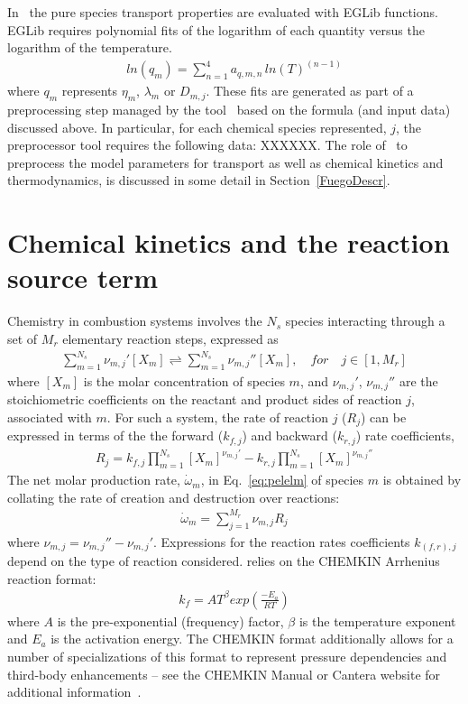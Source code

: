 In \pelelm\ the pure species transport properties are evaluated with EGLib functions.  EGLib requires polynomial fits of the logarithm of each quantity versus the logarithm of the temperature.
\begin{eqnarray*}
ln(q_m) = \sum_{n=1}^4 a_{q,m,n} \, ln(T)^{(n-1)} 
\end{eqnarray*}
where $q_m$ represents $\eta_m$, $\lambda_m$ or $D_{m,j}$. These fits are generated as part of a preprocessing step managed by the tool \fuego\ based on the formula (and input data) discussed above.  In particular, for each chemical species represented, $j$, the preprocessor tool requires the following data: XXXXXX.  The role of \fuego\ to preprocess the model parameters for transport as well as chemical kinetics and thermodynamics, is discussed in some detail in Section~\ref{FuegoDescr}.

\section{Chemical kinetics and the reaction source term}
\label{ChemKinetics}
Chemistry in combustion systems involves the $N_s$ species interacting through a set of $M_r$ elementary reaction steps, expressed as
\begin{eqnarray*}
\sum_{m=1}^{N_s} \nu_{m,j}'[X_m] \rightleftharpoons \sum_{m=1}^{N_s} \nu_{m,j}''[X_m],\quad for \quad j \in [1,M_r] 
\label{IntroKM1}
\end{eqnarray*}
where $[X_m]$ is the molar concentration of species $m$, and $\nu_{m,j}'$, $\nu_{m,j}''$ are the stoichiometric coefficients on the reactant and product sides of reaction $j$, associated with $m$. For such a system, the rate of reaction $j$ ($R_j$) can be expressed in terms of the the forward ($k_{f,j}$) and backward ($k_{r,j}$) rate coefficients,
\begin{eqnarray*} 
R_{j} = k_{f,j}\prod_{m=1}^{N_s}  [X_{m}]^{\nu_{m,j}'}-k_{r,j}\prod_{m=1}^{N_s} [X_{m}]^{\nu_{m,j}''}
\end{eqnarray*}
The net molar production rate, $ \dot{\omega}_m$, in Eq.~\ref{eq:pelelm} of species $m$ is obtained by
collating the rate of creation and destruction over reactions:
\begin{eqnarray*}
\dot{\omega}_m = \sum_{j=1}^{M_r} \nu_{m,j} R_j 
\label{IntroKM3}
\end{eqnarray*}
where $\nu_{m,j} =\nu_{m,j}'' - \nu_{m,j}'$. Expressions for the reaction rates coefficients $k_{(f,r),j}$ depend on the type of reaction considered. \pelelm \; relies on the CHEMKIN Arrhenius reaction format:
\begin{eqnarray*}
k_f = AT^{\beta} exp \left( \frac{-E_a}{RT}\right)
\end{eqnarray*}
where $A$ is the pre-exponential (frequency) factor, $\beta$ is the temperature exponent and $E_a$ is the activation energy. The CHEMKIN format additionally allows for a number of specializations of this format to represent pressure dependencies and third-body enhancements -- see the CHEMKIN Manual or Cantera website for additional information~\cite{Kee:1989,cantera}.

